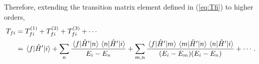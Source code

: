 \documentclass[12pt,a4paper]{article}
\begin{document}
\begin{solution_pset}
		Therefore, extending the transition matrix element defined in
		(\ref{eq:Tfi}) to higher orders,
		\begin{equation}
			\begin{aligned}
			T_{fi}
			&=
			T_{fi}^{(1)}
			+
			T_{fi}^{(2)}
			+
			T_{fi}^{(3)}
			+\cdots
			\\
			&=
			\matrixel{f}{\hat H'}{i}
			+
			\sum_n
			\frac{
				\matrixel{f}{\hat H'}{n}
				\matrixel{n}{\hat H'}{i}
			}{
				E_i-E_n
			}
			+
			\sum_{m,n}
			\frac{
				\matrixel{f}{\hat H'}{m}
				\matrixel{m}{\hat H'}{n}
				\matrixel{n}{\hat H'}{i}
			}{
				(E_i-E_m)(E_i-E_n)
			}
			+\cdots.
			\end{aligned}
			\label{eq:Tfi-expansion}
		\end{equation}
	\end{solution_pset}
	\newpage

\end{document}
